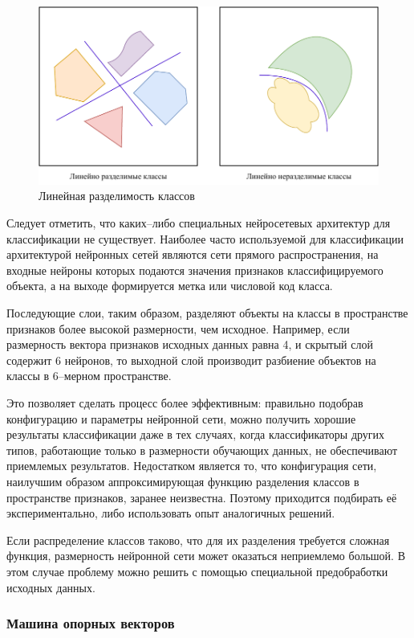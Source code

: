 \begin{figure}[H]
	\centering
	\includegraphics[width=\textwidth]{img/separation.pdf}
	\caption{Линейная разделимость классов}
	\label{fig:separation}
\end{figure}

Следует отметить, что каких--либо специальных нейросетевых архитектур для классификации не существует. Наиболее часто используемой для классификации архитектурой нейронных сетей являются сети прямого распространения, на входные нейроны которых подаются значения признаков классифицируемого объекта, а на выходе формируется метка или числовой код класса.

Последующие слои, таким образом, разделяют объекты на классы в пространстве признаков более высокой размерности, чем исходное. Например, если размерность вектора признаков исходных данных равна 4, и скрытый слой содержит 6 нейронов, то выходной слой производит разбиение объектов на классы в 6--мерном пространстве.

Это позволяет сделать процесс более эффективным: правильно подобрав конфигурацию и параметры нейронной сети, можно получить хорошие результаты классификации даже в тех случаях, когда классификаторы других типов, работающие только в размерности обучающих данных, не обеспечивают приемлемых результатов. Недостатком является то, что конфигурация сети, наилучшим образом аппроксимирующая функцию разделения классов в пространстве признаков, заранее неизвестна. Поэтому приходится подбирать её экспериментально, либо использовать опыт аналогичных решений.

Если распределение классов таково, что для их разделения требуется сложная функция, размерность нейронной сети может оказаться неприемлемо большой. В этом случае проблему можно решить с помощью специальной предобработки исходных данных.

\subsubsection{Машина опорных векторов}

